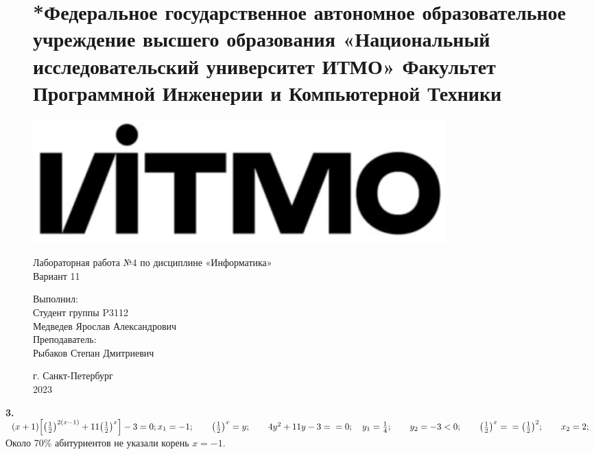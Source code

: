 \documentclass[a4paper, 14pt]{article}
\begin{document}
    \onecolumn
    \begin{figure}[!t]
        \begin{center}
            \section*{*Федеральное государственное автономное образовательное учреждение  высшего образования «Национальный исследовательский университет  ИТМО» 
            Факультет Программной Инженерии и Компьютерной Техники }
        \end{center}
        \underline{\hspace{15cm}}
    \end{figure}
    \begin{figure}[!Hc]
        \centering
        \includegraphics{ITMO_logo.png}
        \begin{center}\Large Лабораторная работа №4 по дисциплине «Информатика» \\Вариант 11\end{center}
    \end{figure}\par
    \begin{figure}[!b]
        \parbox[!b]{15 cm}{
        \begin{flushright}
            \Large
            Выполнил: \\
            Студент группы P3112\\
            Медведев Ярослав Александрович\\
            Преподаватель:\\
            Рыбаков Степан Дмитриевич\\
        \end{flushright} 
        }
        \begin{center}
            \Large
            г. Санкт-Петербург \\
            2023
        \end{center}
    \end{figure}
    \pagestyle{empty}
    \twocolumn
    \begin{doublespace}
        \textbf{3.} \((x + 1)\Big[\big(\frac{1}{2}\big)^{2(x-1)} + 11\big(\frac{1}{2}\big)^{x}\Big]-3=0; \\ x_1=-1;\qquad \big(\frac{1}{2}\big)^{x}=y;\qquad 4y^{2} + 11y -3=\\=0;\quad y_1=\frac{1}{4};\qquad y_2=-3<0;\qquad \big(\frac{1}{2}\big)^{x}=\\=\big(\frac{1}{2}\big)^{2};\qquad x_2=2;\)
        Около 70\% абитуриентов не указали корень \(x=-1\).
    \end{doublespace}\par
\end{document}
